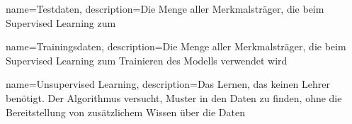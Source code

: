 
{
  name={Testdaten},
  description={Die Menge aller Merkmalsträger, die beim Supervised Learning zum}
}

{
  name={Trainingsdaten},
  description={Die Menge aller Merkmalsträger, die beim Supervised Learning zum Trainieren des Modells verwendet wird}
}

{
  name={Unsupervised Learning},
  description={Das Lernen, das keinen Lehrer benötigt. Der Algorithmus versucht, Muster in den Daten zu finden, ohne die Bereitstellung von zusätzlichem Wissen über die Daten}
}